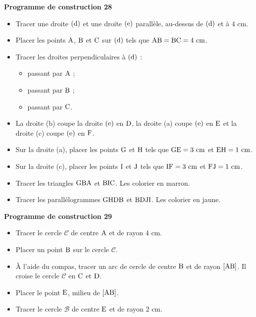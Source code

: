 \documentclass{article}
\begin{document}
\noindent\textbf{Programme de construction 28}\par\smallskip\noindent
\begin{itemize}
    \item Tracer une droite $(\text{d})$ et une droite
    $(\text{e})$ parallèle, au-dessus de $(\text{d})$ et à
    $4\text{ cm}$.
    \item Placer les points $\text{A}$, $\text{B}$ et
    $\text{C}$ sur $(\text{d})$ tels que
    $\text{AB}=\text{BC}=4\text{ cm}$.
    \item Tracer les droites perpendiculaires à $(\text{d})$ :
    \begin{itemize}
        \item[(a)] passant par $\text{A}$ ;
        \item[(b)] passant par $\text{B}$ ;
        \item[(c)] passant par $\text{C}$.
    \end{itemize}
    \item La droite (b) coupe la droite $(\text{e})$ en
    $\text{D}$, la droite (a) coupe $(\text{e})$ en
    $\text{E}$ et la droite (c) coupe $(\text{e})$ en
    $\text{F}$.
    \item Sur la droite (a), placer les points $\text{G}$ et
    $\text{H}$ tels que $\text{GE}=3\text{ cm}$ et
    $\text{EH}=1\text{ cm}$.
    \item Sur la droite (c), placer les points $\text{I}$ et
    $\text{J}$ tels que $\text{IF}=3\text{ cm}$ et
    $\text{FJ}=1\text{ cm}$.
    \item Tracer les triangles $\text{GBA}$ et $\text{BIC}$.
    Les colorier en marron.
    \item Tracer les parallélogrammes $\text{GHDB}$ et
    $\text{BDJI}$. Les colorier en jaune.
\end{itemize}
\noindent\textbf{Programme de construction 29}\par\smallskip\noindent
\begin{itemize}
    \item Tracer le cercle $\mathcal{C}$ de centre $\text{A}$ et de
    rayon $4\text{ cm}$.
    \item Placer un point $\text{B}$ sur le cercle $\mathcal{C}$.
    \item À l'aide du compas, tracer un arc de cercle de centre
    $\text{B}$ et de rayon $[\text{AB}]$. Il croise le cercle
    $\mathcal{C}$ en $\text{C}$ et $\text{D}$.
    \item Placer le point $\text{E}$, milieu de $[\text{AB}]$.
    \item Tracer le cercle $\mathcal{B}$ de centre $\text{E}$ et de
    rayon $2\text{ cm}$.
\end{itemize}
\end{document}

